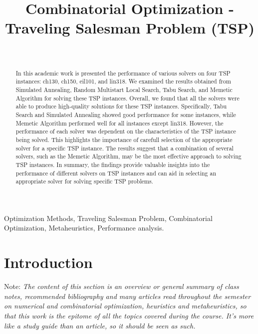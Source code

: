 \documentclass[conference]{IEEEtran}
\begin{document}
\title{Combinatorial Optimization - Traveling Salesman Problem (TSP)}
\author{
	\\
}

\maketitle

\begin{abstract}
In this academic work is presented the performance of various solvers on four TSP instances: ch130, ch150, eil101, and lin318. We examined the results obtained from Simulated Annealing, Random Multistart Local Search, Tabu Search, and Memetic Algorithm for solving these TSP instances. Overall, we found that all the solvers were able to produce high-quality solutions for these TSP instances. Specifically, Tabu Search and Simulated Annealing showed good performance for some instances, while Memetic Algorithm performed well for all instances except lin318. However, the performance of each solver was dependent on the characteristics of the TSP instance being solved. This highlights the importance of carefull selection of the appropriate solver for a specific TSP instance. The results suggest that a combination of several solvers, such as the Memetic Algorithm, may be the most effective approach to solving TSP instances. In summary, the findings provide valuable insights into the performance of different solvers on TSP instances and can aid in selecting an appropriate solver for solving specific TSP problems.
\end{abstract}

\begin{IEEEkeywords}
	Optimization Methods, Traveling Salesman Problem, Combinatorial Optimization, Metaheuristics,	Performance analysis.
\end{IEEEkeywords}

\section{Introduction}
\label{sec:introduction}
Note: \textit{The content of this section is an overview or general summary of class notes, recommended bibliography and many articles read throughout the semester on numerical and combinatorial optimization, heuristics and metaheuristics, so that this work is the epitome of all the topics covered during the course. It's more like a study guide than an article, so it should be seen as such.}
\end{document}
